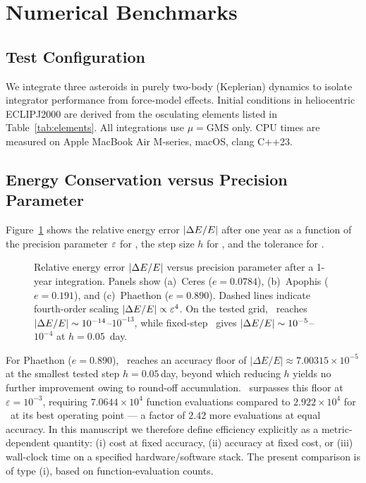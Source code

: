 
\section{Numerical Benchmarks}
\label{sec:benchmark}

\subsection{Test Configuration}
\label{sec:testconfig}

We integrate three asteroids in purely two-body (Keplerian) dynamics
to isolate integrator performance from force-model effects.
Initial conditions in heliocentric ECLIPJ2000 are derived from
the osculating elements listed in Table~\ref{tab:elements}.
All integrations use $\mu = \mathrm{GMS}$ only.
CPU times are measured on Apple MacBook Air M-series, macOS,
clang C++23.



\subsection{Energy Conservation versus Precision Parameter}
\label{sec:energy_bench}

Figure~\ref{fig:energy_vs_precision} shows the relative energy error
$|\Delta E/E|$ after one year as a function of the precision parameter $\varepsilon$
for \AAS, the step size $h$ for \saba, and the tolerance for \rkf.

\begin{figure}
\caption{
  Relative energy error $|\Delta E/E|$ versus precision parameter
  after a 1-year integration.
  Panels show (a)~Ceres ($e=0.0784$), (b)~Apophis ($e=0.191$),
  and (c)~Phaethon ($e=0.890$).
  Dashed lines indicate fourth-order scaling $|\Delta E/E| \propto \varepsilon^4$.
  On the tested grid, \AAS\ reaches
  $|\Delta E/E|\sim10^{-14}$--$10^{-13}$, while fixed-step \saba\
  gives $|\Delta E/E|\sim10^{-5}$--$10^{-4}$ at $h=0.05$~day.
  \label{fig:energy_vs_precision}
}
\end{figure}

For Phaethon ($e = 0.890$), \saba\ reaches an accuracy
floor of $|\Delta E/E| \approx 7.00315\times10^{-5}$
at the smallest tested step $h = 0.05$\,day, beyond which
reducing $h$ yields no further improvement owing to
round-off accumulation. \AAS\ surpasses this floor at
$\varepsilon = 10^{-3}$, requiring
$7.0644\times10^4$ function evaluations
compared to $2.922\times10^4$ for \saba\
at its best operating point --- a factor of $2.42$
more evaluations at equal accuracy.
In this manuscript we therefore define efficiency explicitly as a
metric-dependent quantity: (i) cost at fixed accuracy,
(ii) accuracy at fixed cost, or (iii) wall-clock time on a specified
hardware/software stack. The present comparison is of type (i), based
on function-evaluation counts.

